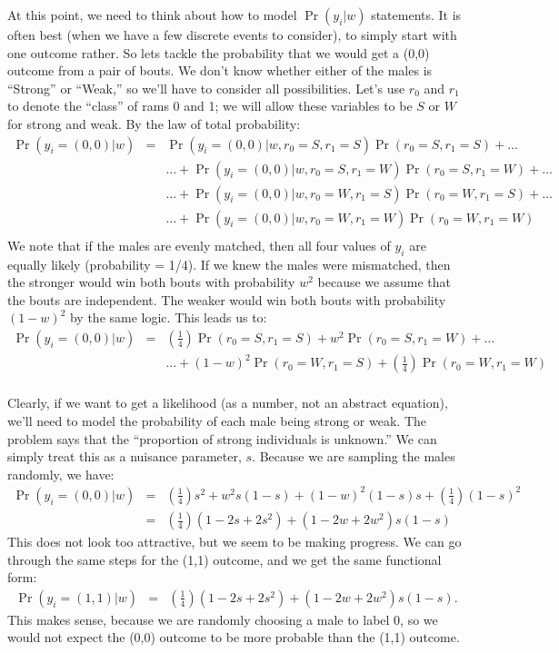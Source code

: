 \documentclass[11pt]{article}
\begin{document}
At this point, we need to think about how to model $\Pr(y_i|w)$ statements.
It is often best (when we have a few discrete events to consider), to simply start with one outcome rather.
So lets tackle the probability that we would get a (0,0) outcome from a pair of bouts.
We don't know whether either of the males is ``Strong'' or ``Weak,'' so we'll have to consider all possibilities.
Let's use $r_0$ and $r_1$ to denote the ``class'' of rams 0 and 1; we will allow these variables to be $S$ or $W$ for strong and weak.
By the law of total probability:
\begin{eqnarray*} 
 \Pr(y_i = (0,0)|w)  & = & \Pr(y_i = (0,0)|w,r_0=S,r_1=S)\Pr(r_0=S,r_1=S) + \ldots \\
 & & \ldots + \Pr(y_i = (0,0)|w,r_0=S,r_1=W)\Pr(r_0=S,r_1=W) + \ldots \\
 & & \ldots + \Pr(y_i = (0,0)|w,r_0=W,r_1=S)\Pr(r_0=W,r_1=S) + \ldots \\
 & & \ldots + \Pr(y_i = (0,0)|w,r_0=W,r_1=W)\Pr(r_0=W,r_1=W) \\
\end{eqnarray*}
We note that if the males are evenly matched, then all four values of $y_i$ are equally likely (probability = 1/4).
If we knew the males were mismatched, then the stronger would win both bouts with probability $w^2$ because we assume that the bouts are independent.
The weaker would win both bouts with probability $(1-w)^2$ by the same logic. This leads us to:
\begin{eqnarray*} 
 \Pr(y_i = (0,0)|w)  & = &   \left(\frac{1}{4}\right)\Pr(r_0=S,r_1=S) + w^2 \Pr(r_0=S,r_1=W) + \ldots \\
 &  & \ldots + (1-w)^2\Pr(r_0=W,r_1=S) + \left(\frac{1}{4}\right)\Pr(r_0=W,r_1=W) \\
\end{eqnarray*}

Clearly, if we want to get a likelihood (as a number, not an abstract equation), we'll need to model the probability of each male being strong or weak. 
The problem says that the ``proportion of strong individuals is unknown.''
We can simply treat this as a nuisance parameter, $s$.
Because we are sampling the males randomly, we have:
\begin{eqnarray*} 
 \Pr(y_i = (0,0)|w)  & = &   \left(\frac{1}{4}\right)s^2 + w^2 s(1-s)  + (1-w)^2(1-s)s + \left(\frac{1}{4}\right)(1-s)^2 \\
	 & = &   \left(\frac{1}{4}\right)(1-2s +2s^2) + (1 -2w +2w^2) s(1-s)
\end{eqnarray*}
This does not look too attractive, but we seem to be making progress. We can go through the same steps for the (1,1) outcome, and we get the same functional form:
\begin{eqnarray*} 
 \Pr(y_i = (1,1)|w)  & = &   \left(\frac{1}{4}\right)(1-2s +2s^2) + (1 -2w +2w^2) s(1-s).
\end{eqnarray*}
This makes sense, because we are randomly choosing a male to label 0, so we would not expect the (0,0) outcome to be more probable than the (1,1) outcome.
\end{document}
